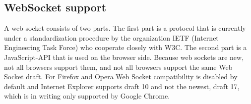\subsection{WebSocket support}


A web socket consists of two parts.
The first part is a protocol that is currently under a standardization 
procedure by the organization IETF (Internet Engineering Task Force) who 
cooperate closely with W3C\cite{andersen10}. The second part is a 
JavaScript-API that is used on the browser side\cite{andersen10}. 
Because web sockets are new, not all browsers support them, and not all 
browsers support the same Web Socket draft\cite{websocketprotocol11}. For 
Firefox and Opera Web Socket compatibility is disabled by 
default\cite{websocketprotocol11} and Internet Explorer supports draft 10 and 
not the newest, draft 17, which is in writing only supported by 
Google Chrome\cite{websocketprotocol11}.